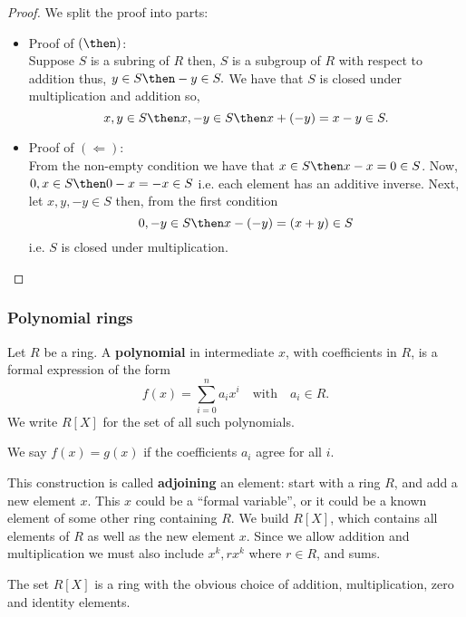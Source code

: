 \documentclass[12pt, a4paper]{article}
\begin{document}
\begin{proof}
    We split the proof into parts: 
    \begin{itemize}
        \item Proof of \((\then)\): \\
        Suppose \(S\) is a subring of \(R\) then, \(S\) is a subgroup of \(R\) with respect to addition thus, \(y \in S \then -y \in S.\) We have that \(S\) is closed under multiplication and addition so,
        \[x,y \in S \then x,-y \in S \then x+(-y) = x-y \in S.\]
        \item Proof of \((\Leftarrow)\): \\
        From the non-empty condition we have that \(x \in S \then x-x =0 \in S\). Now, \(0,x \in S \then 0-x =-x \in S\) i.e. each element has an additive inverse. Next, let \(x,y,-y \in S\) then, from the first condition
        \[0,-y \in S \then x-(-y) = (x+y) \in S\]
        i.e. \(S\) is closed under multiplication.
    \end{itemize}
\end{proof}

\subsubsection{Polynomial rings}

\begin{definition}
    Let \(R\) be a ring. A \textbf{polynomial} in intermediate \(x\), with coefficients in \(R\), is a formal expression of the form
    \[f(x) = \sum_{i=0}^{n} a_i x^i \quad \text{with} \quad a_i \in R.\]
    We write \(R[X]\) for the set of all such polynomials.
\end{definition}

\begin{mdremark}
    We say \(f(x)=g(x)\) if the coefficients \(a_i\) agree for all \(i\).
\end{mdremark}

\begin{mdnote}
    This construction is called \textbf{adjoining} an element: start with a ring \(R\), and add a new element \(x\). This \(x\) could be a ``formal variable'', or it could be a known element of some other ring containing \(R\). We build \(R[X]\), which contains all elements of \(R\) as well as the new element \(x\). Since we allow addition and multiplication we must also include \(x^k, rx^k\) where \(r \in R\), and sums.
\end{mdnote}

\begin{proposition}
    The set \(R[X]\) is a ring with the obvious choice of addition, multiplication, zero and identity elements.
\end{proposition}
\end{document}
